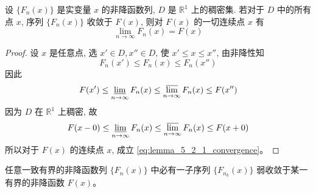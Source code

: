 \begin{lemma}\label{lem:fn_convergence}
    设 $\{F_n(x)\}$ 是实变量 $x$ 的非降函数列, $D$ 是 $\mathbb{R}^1$ 上的稠密集. 若对于 $D$ 中的所有点 $x$, 序列 $\{F_n(x)\}$ 收敛于 $F(x)$, 则对 $F(x)$ 的一切连续点 $x$ 有
\begin{equation} \label{eq:lemma_5_2_1_convergence}
\lim_{n\to\infty} F_n(x) = F(x)
\end{equation}
\end{lemma}
\begin{proof}
    设 $x$ 是任意点, 选 $x' \in D, x'' \in D$, 使 $x' \le x \le x''$, 由非降性知
\[
F_n(x') \le F_n(x) \le F_n(x'')
\]
因此
\[
F(x') \le \varliminf_{n\to\infty} F_n(x) \le \varlimsup_{n\to\infty} F_n(x) \le F(x'')
\]
因为 $D$ 在 $\mathbb{R}^1$ 上稠密, 故
\[
F(x-0) \le \varliminf_{n\to\infty} F_n(x) \le \varlimsup_{n\to\infty} F_n(x) \le F(x+0)
\]
所以对于 $F(x)$ 的连续点 $x$, 成立 \eqref{eq:lemma_5_2_1_convergence}。

\end{proof}
\begin{theorem}[海莱第一定理]\label{thm:helly_first}
    任意一致有界的非降函数列 $\{F_n(x)\}$ 中必有一子序列 $\{F_{n_k}(x)\}$ 弱收敛于某一有界的非降函数 $F(x)$。
\end{theorem}
